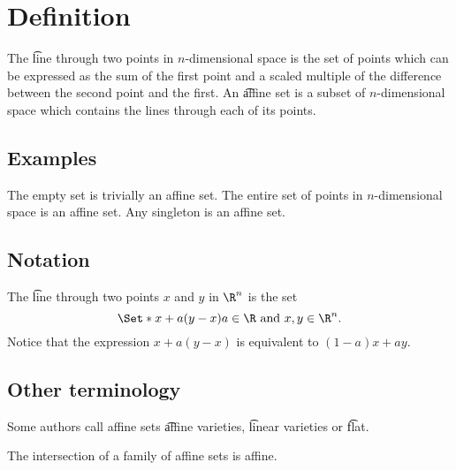 
\section*{Definition}

The \t{line through} two points in $n$-dimensional space is the set of points which can be expressed as the sum of the first point and a scaled multiple of the difference between the second point and the first.
An \t{affine set} is a subset of $n$-dimensional space which contains the lines through each of its points.

\subsection*{Examples}

The empty set is trivially an affine set.
The entire set of points in $n$-dimensional space is an affine set.
Any singleton is an affine set.

\subsection*{Notation}

The \t{line through} two points $x$ and $y$ in $\R ^n$ is the set
  \[
\Set*{x + a(y - x)}{a \in \R  \text{ and } x, y \in \R ^n}.
  \]
Notice that the expression $x + a(y - x)$ is equivalent to $(1 - a)x + ay$.

\subsection*{Other terminology}

Some authors call affine sets \t{affine varieties}, \t{linear varieties} or \t{flat}.

\begin{proposition}
The intersection of a family of affine sets is affine.
\end{proposition}

\blankpage